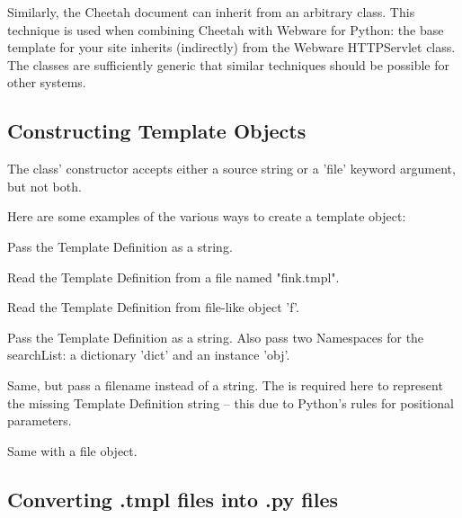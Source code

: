 Similarly, the Cheetah document can inherit from an arbitrary class. This
technique is used when combining Cheetah with Webware for Python: the base
template for your site inherits (indirectly) from the Webware HTTPServlet class.
The classes are sufficiently generic that similar techniques should be possible
for other systems.

\subsection{Constructing Template Objects}
\label{howWorks.constructing}

The  class' constructor accepts either a source string or a
'file' keyword argument, but not both.

Here are some examples of the various ways to create a template object:
\begin{description}
\item{}
     Pass the Template Definition as a string.
\item{}
     Read the Template Definition from a file named "fink.tmpl".  
\item{}
     Read the Template Definition from file-like object 'f'.
\item{}
     Pass the Template Definition as a string.  Also pass two Namespaces for the
     searchList: a dictionary 'dict' and an instance 'obj'.
\item{}
     Same, but pass a filename instead of a string.  The  is required
     here to represent the missing Template Definition string -- this due to
     Python's rules for positional parameters.
\item{}
     Same with a file object.
\end{description}


\subsection{Converting .tmpl files into .py files}
\label{howWorks.tmpl2py}
\label{howWorks.cheetah-compile}


